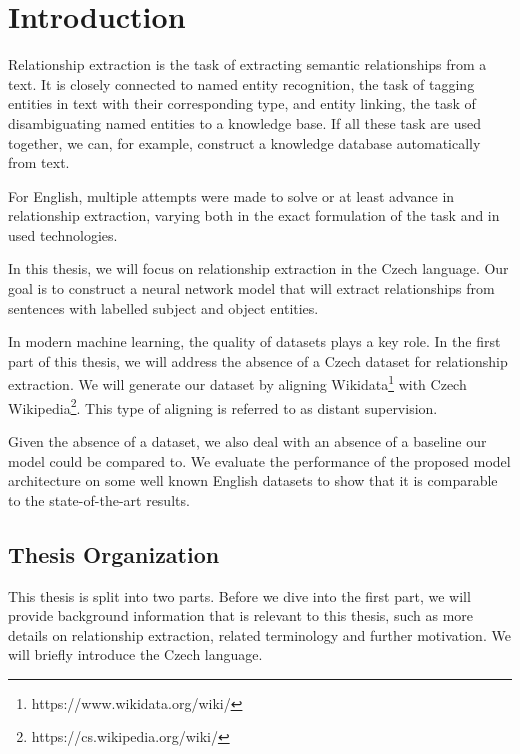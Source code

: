 \chapter*{Introduction}


Relationship extraction is the task of extracting semantic relationships from a text. It is closely connected to named entity recognition, the task of tagging entities in text with their corresponding type, and entity linking, the task of disambiguating named entities to a knowledge base. If all these task are used together, we can, for example, construct a knowledge database automatically from text. 

For English, multiple attempts were made to solve or at least advance in relationship extraction, varying both in the exact formulation of the task and in used technologies. 

In this thesis, we will focus on relationship extraction in the Czech language. Our goal is to construct a neural network model that will extract relationships from sentences with labelled subject and object entities. %

In modern machine learning, the quality of datasets plays a key role. In the first part of this thesis, we will address the absence of a Czech dataset for relationship extraction. We will generate our dataset by aligning Wikidata\footnote{https://www.wikidata.org/wiki/} with Czech Wikipedia\footnote{https://cs.wikipedia.org/wiki/}. This type of aligning is referred to as distant supervision. %

Given the absence of a dataset, we also deal with an absence of a baseline our model could be compared to. We evaluate the performance of the proposed model architecture on some well known English datasets to show that it is comparable to the state-of-the-art results.





\section*{Thesis Organization}
This thesis is split into two parts. Before we dive into the first part, we will provide background information that is relevant to this thesis, such as more details on relationship extraction, related terminology and further motivation. We will briefly introduce the Czech language.

